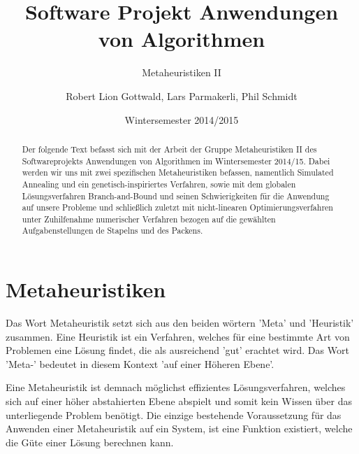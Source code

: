 \documentclass[runningheads,a4paper]{llncs}
\begin{document}
\mainmatter

\title{Software Projekt Anwendungen von Algorithmen}
\subtitle{Metaheuristiken II}
\date{Wintersemester 2014/2015}

\author{Robert Lion Gottwald, Lars Parmakerli, Phil Schmidt}

\maketitle
\begin{abstract}
Der folgende Text befasst sich mit der Arbeit der Gruppe Metaheuristiken II des Softwareprojekts Anwendungen von Algorithmen im Wintersemester 2014/15. Dabei werden wir uns mit zwei  spezifischen Metaheuristiken befassen, namentlich Simulated Annealing und ein genetisch-inspiriertes Verfahren, sowie mit dem globalen Lösungsverfahren Branch-and-Bound und seinen Schwierigkeiten für die Anwendung auf unsere Probleme und schließlich zuletzt mit nicht-linearen Optimierungsverfahren unter Zuhilfenahme numerischer Verfahren bezogen auf die gewählten Aufgabenstellungen de Stapelns und des Packens.

\end{abstract}

\section{Metaheuristiken}

Das Wort Metaheuristik setzt sich aus den beiden wörtern 'Meta' und 'Heuristik'  zusammen.
Eine Heuristik ist ein Verfahren, welches für eine bestimmte Art von Problemen eine Lösung findet, die als ausreichend 'gut' erachtet wird. 
Das Wort 'Meta-' bedeutet in diesem Kontext 'auf einer Höheren Ebene'.

Eine Metaheuristik ist demnach möglichst effizientes Lösungsverfahren, welches sich auf einer höher abstahierten Ebene abspielt und somit kein Wissen über das unterliegende Problem benötigt. Die einzige bestehende Voraussetzung für das Anwenden einer Metaheuristik auf ein System, ist eine Funktion existiert, welche die Güte einer Lösung berechnen kann.
\end{document}
